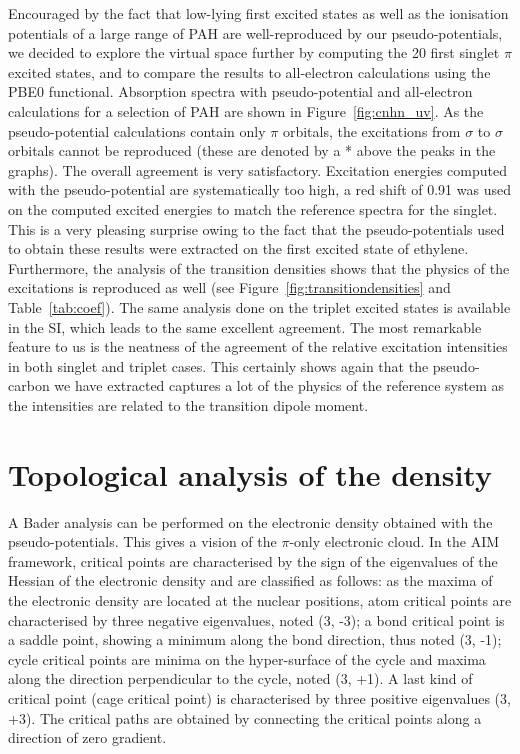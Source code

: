 \documentclass[12pt]{article}
\begin{document}
Encouraged by the fact that low-lying first excited states as well as the ionisation potentials of a large range of PAH are well-reproduced by our pseudo-potentials,
we decided to explore the virtual space further by computing the 20 first singlet
$\pi$ excited states, and to compare the results to all-electron calculations using the PBE0 functional.
Absorption spectra with pseudo-potential and all-electron
calculations for a selection of PAH are shown in Figure~\ref{fig:cnhn_uv}.
As the pseudo-potential calculations contain only $\pi$ orbitals, the excitations from $\sigma$ to $\sigma$ orbitals cannot be reproduced 
(these are denoted by a * above the peaks in the graphs).
The overall agreement is very satisfactory.
Excitation energies computed with the pseudo-potential are systematically too high, a red shift of
0.91 was used on the computed excited energies to match the reference spectra for the singlet.
This is a very pleasing surprise owing to the fact that the pseudo-potentials used
to obtain these results were extracted on the first excited state of ethylene.
Furthermore, the analysis of the transition densities shows that the physics of the excitations
is reproduced as well (see Figure~\ref{fig:transitiondensities} and Table~\ref{tab:coef}).
The same analysis done on the triplet excited states is available in the SI, which leads to the same
excellent agreement.
The most remarkable feature to us is the neatness of the agreement of the relative excitation intensities in both singlet and triplet cases.
This certainly shows again that the pseudo-carbon we have extracted captures a lot of the physics of the reference system as the intensities are related to the transition dipole moment.

\section*{\sffamily \large Topological analysis of the density}
A Bader analysis can be performed on the electronic density obtained with the pseudo-potentials.\cite{bader}
This gives a vision of the $\pi$-only electronic cloud.
In the AIM framework, critical points are characterised by the sign of the eigenvalues of the Hessian of 
the electronic density and are classified as follows:
as the maxima of the electronic density are located at the nuclear positions,
atom critical points are characterised by three negative eigenvalues, noted (3, -3);
a bond critical point is a saddle point, showing a minimum along the bond direction,
thus noted (3, -1); cycle critical points are minima on the hyper-surface of the cycle
and maxima along the direction perpendicular to the cycle, noted (3, +1).
A last kind of critical point (cage critical point) is characterised by three positive eigenvalues
(3, +3).
The critical paths are obtained by connecting the critical points along a direction of zero gradient.
\end{document}
